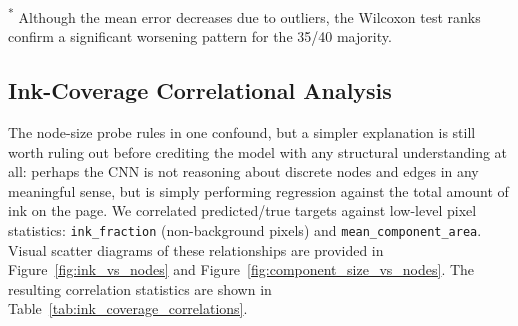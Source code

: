 \documentclass[11pt,letterpaper]{article}
\numberwithin{equation}{section}
\numberwithin{figure}{section}
\numberwithin{table}{section}
\begin{document}
\begin{table}[htbp]
\centering
\caption{Wilcoxon Signed-Rank Test Results for Node-Size and Layout Probes ($n=40$)}
\label{tab:wilcoxon_tests}
\small
{}
\begin{flushleft}
\small \textsuperscript{*} Although the mean error decreases due to outliers, the Wilcoxon test ranks confirm a significant worsening pattern for the 35/40 majority.
\end{flushleft}
\end{table}

\subsection{Ink-Coverage Correlational Analysis}
The node-size probe rules in one confound, but a simpler explanation is still worth ruling out before crediting the model with any structural understanding at all: perhaps the CNN is not reasoning about discrete nodes and edges in any meaningful sense, but is simply performing regression against the total amount of ink on the page. We correlated predicted/true targets against low-level pixel statistics: \texttt{ink\_fraction} (non-background pixels) and \texttt{mean\_component\_area}. Visual scatter diagrams of these relationships are provided in Figure~\ref{fig:ink_vs_nodes} and Figure~\ref{fig:component_size_vs_nodes}. The resulting correlation statistics are shown in Table~\ref{tab:ink_coverage_correlations}.
\end{document}
